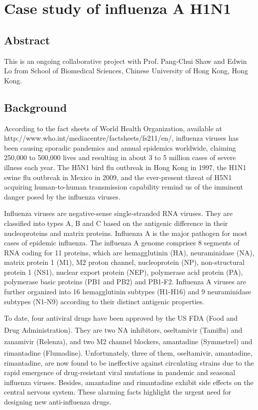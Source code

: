\chapter{Case study of influenza A H1N1}
\label{influenza}

\section{Abstract}

This is an ongoing collaborative project with Prof. Pang-Chui Shaw and Edwin Lo from School of Biomedical Sciences, Chinese University of Hong Kong, Hong Kong.

\section{Background}

According to the fact sheets of World Health Organization, available at http://www.who.int/mediacentre/factsheets/fs211/en/, influenza viruses has been causing sporadic pandemics and annual epidemics worldwide, claiming 250,000 to 500,000 lives and resulting in about 3 to 5 million cases of severe illness each year. The H5N1 bird flu outbreak in Hong Kong in 1997, the H1N1 swine flu outbreak in Mexico in 2009, and the ever-present threat of H5N1 acquiring human-to-human transmission capability remind us of the imminent danger posed by the influenza viruses. 

Influenza viruses are negative-sense single-stranded RNA viruses. They are classified into types A, B and C based on the antigenic difference in their nucleoproteins and matrix proteins. Influenza A is the major pathogen for most cases of epidemic influenza. The influenza A genome comprises 8 segments of RNA coding for 11 proteins, which are hemagglutinin (HA), neuraminidase (NA), matrix protein 1 (M1), M2 proton channel, nucleoprotein (NP), non-structural protein 1 (NS1), nuclear export protein (NEP), polymerase acid protein (PA), polymerase basic proteins (PB1 and PB2) and PB1-F2. Influenza A viruses are further organized into 16 hemagglutinin subtypes (H1-H16) and 9 neuraminidase subtypes (N1-N9) according to their distinct antigenic properties.

To date, four antiviral drugs have been approved by the US FDA (Food and Drug Administration). They are two NA inhibitors, oseltamivir (Tamiflu\textsuperscript{\textregistered}) and zanamivir (Relenza\textsuperscript{\textregistered}), and two M2 channel blockers, amantadine (Symmetrel\textsuperscript{\textregistered}) and rimantadine (Flumadine\textsuperscript{\textregistered}). Unfortunately, three of them, oseltamivir, amantadine, rimantadine, are now found to be ineffective against circulating strains due to the rapid emergence of drug-resistant viral mutations in pandemic and seasonal influenza viruses. Besides, amantadine and rimantadine exhibit side effects on the central nervous system. These alarming facts highlight the urgent need for designing new anti-influenza drugs.

